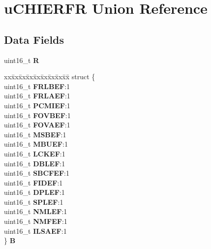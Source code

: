 \hypertarget{unionuCHIERFR}{}\section{u\+C\+H\+I\+E\+R\+FR Union Reference}
\label{unionuCHIERFR}
\subsection*{Data Fields}
\begin{DoxyCompactItemize}
\item 
\mbox{\label{unionuCHIERFR_acb005bc3c4ac70802d17558b124199c1}} 
uint16\+\_\+t {\bfseries R}
\item 
\mbox{\label{unionuCHIERFR_a0107726e3378e36f396b37758d2a3033}} 
\begin{tabbing}
xx\=xx\=xx\=xx\=xx\=xx\=xx\=xx\=xx\=\kill
struct \{\\
\>uint16\_t {\bfseries FRLBEF}:1\\
\>uint16\_t {\bfseries FRLAEF}:1\\
\>uint16\_t {\bfseries PCMIEF}:1\\
\>uint16\_t {\bfseries FOVBEF}:1\\
\>uint16\_t {\bfseries FOVAEF}:1\\
\>uint16\_t {\bfseries MSBEF}:1\\
\>uint16\_t {\bfseries MBUEF}:1\\
\>uint16\_t {\bfseries LCKEF}:1\\
\>uint16\_t {\bfseries DBLEF}:1\\
\>uint16\_t {\bfseries SBCFEF}:1\\
\>uint16\_t {\bfseries FIDEF}:1\\
\>uint16\_t {\bfseries DPLEF}:1\\
\>uint16\_t {\bfseries SPLEF}:1\\
\>uint16\_t {\bfseries NMLEF}:1\\
\>uint16\_t {\bfseries NMFEF}:1\\
\>uint16\_t {\bfseries ILSAEF}:1\\
\} {\bfseries B}\\


\end{tabbing}
\end{DoxyCompactItemize}
